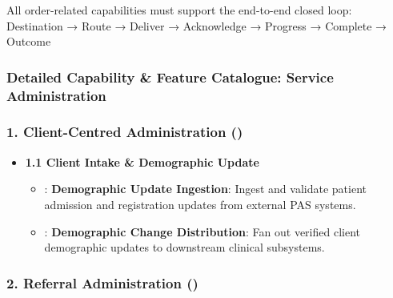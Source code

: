 All order-related capabilities must support the end-to-end closed loop: Destination → Route → Deliver → Acknowledge → Progress → Complete → Outcome

\label{rad:enabling:275}

\par\smallskip
{}\label{rad:enabling:277}
\subsubsection*{Detailed Capability \& Feature Catalogue: Service Administration}
\label{rad:enabling:279}
\subsubsection*{1. Client-Centred Administration (\texttt{})}
\label{rad:enabling:280}

\begin{itemize}

\item
\textbf{1.1 Client Intake \& Demographic Update}


\begin{itemize}

\item
\texttt{}: \textbf{Demographic Update Ingestion}: Ingest and validate patient admission and registration updates from external PAS systems.



\item
\texttt{}: \textbf{Demographic Change Distribution}: Fan out verified client demographic updates to downstream clinical subsystems.



\end{itemize}


\end{itemize}
\label{rad:enabling:284}
\subsubsection*{2. Referral Administration (\texttt{})}
\label{rad:enabling:285}

